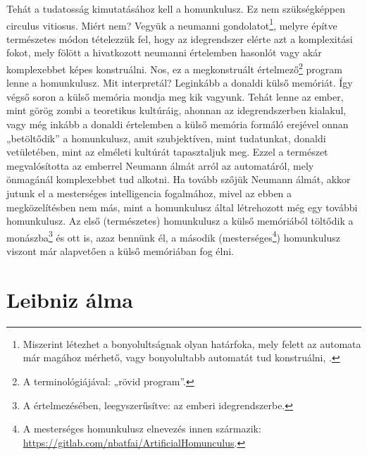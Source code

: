 \documentclass[a4paper]{article}
\begin{document}
Tehát a tudatosság kimutatásához kell a homunkulusz. Ez nem szükségképpen circulus vitiosus. Miért nem? Vegyük a neumanni \cite[208]{Neumann03} gondolatot\footnote{Miszerint létezhet a bonyolultságnak olyan határfoka, mely felett az automata már magához mérhető, vagy bonyolultabb automatát tud konstruálni, \cite[208]{Neumann03}.}, melyre építve természetes módon tételezzük fel, hogy az idegrendszer elérte azt a komplexitási fokot, mely fölött a hivatkozott neumanni értelemben hasonlót vagy akár komplexebbet képes konstruálni. Nos, ez a megkonstruált értelmező\footnote{A \cite{Neumann72} terminológiájával: „rövid program”.} program lenne a homunkulusz. Mit interpretál? Leginkább a donaldi külső memóriát. Így végső soron a külső memória mondja meg kik vagyunk. Tehát lenne az ember, mint görög zombi \cite{Sleutels06} a teoretikus kultúráig, ahonnan az idegrendszerben kialakul, vagy még inkább a donaldi értelemben a külső memória formáló erejével onnan „betöltődik” a homunkulusz, amit szubjektíven, mint tudatunkat, donaldi vetületében, mint az elméleti kultúrát tapasztaljuk meg. Ezzel a természet megvalósította az emberrel Neumann álmát arról az automatáról, mely önmagánál komplexebbet tud alkotni. Ha tovább szőjük Neumann álmát, akkor jutunk el a mesterséges intelligencia fogalmához, mivel az ebben a megközelítésben nem más, mint a homunkulusz által létrehozott még egy további homunkulusz. Az első (természetes) homunkulusz a külső memóriából töltődik a monászba\footnote{A \cite[274]{Donald01} értelmezésében, leegyszerűsítve: az emberi idegrendszerbe.} és ott is, azaz bennünk él, a második (mesterséges\footnote{A mesterséges homunkulusz elnevezés innen származik: \url{https://gitlab.com/nbatfai/ArtificialHomunculus}.}) homunkulusz viszont már alapvetően a külső memóriában fog élni.

\section{Leibniz álma}
\end{document}
